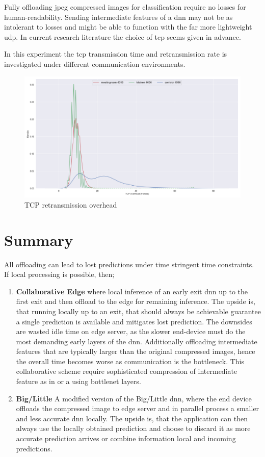 Fully offloading \gls{jpeg} compressed images for classification require no losses for human-readability. Sending intermediate features of a \gls{dnn} may not be as intolerant to losses and might be able to function with the far more lightweight \gls{udp}. In current research literature the choice of \gls{tcp} seems given in advance.  

In this experiment the \gls{tcp} transmission time and retransmission rate is investigated under different communication environments. 

\begin{figure}
	\centering
	\includegraphics[width=\linewidth]{figures/tcp/tcpoverhead}
	\caption[TCP retransmission overhead]{TCP retransmission overhead}
\end{figure}

\section{Summary}

All offloading can lead to lost predictions under time stringent time constraints. If local processing is possible, then;

\begin{enumerate}
	\item \textbf{Collaborative Edge} where local inference of an early exit \gls{dnn} up to the first exit and then offload to the edge for remaining inference. The upside is, that running locally up to an exit, that should always be achievable guarantee a single prediction is available and mitigates lost prediction. The downsides are wasted idle time on edge server, as the slower end-device must do the most demanding early layers of the \gls{dnn}. Additionally offloading intermediate features that are typically larger than the original compressed images, hence the overall time becomes worse as communication is the bottleneck. This collaborative scheme require sophisticated compression of intermediate feature as in \cite{choi_near-lossless_2018} or a using \gls{bottlenet} layers.
	\item \textbf{Big/Little} A modified version of the Big/Little \gls{dnn}, where the end device offloads the compressed image to edge server and in parallel process a smaller and less accurate \gls{dnn} locally. The upside is, that the application can then always use the locally obtained prediction and choose to discard it as more accurate prediction arrives or combine information local and incoming predictions.
\end{enumerate}

